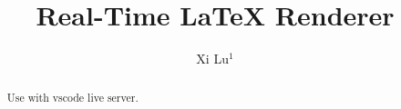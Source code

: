 \documentclass[aps,pra,reprint,twocolumn,nofootinbib]{revtex4-2}
\begin{document}
\title{
    Real-Time LaTeX Renderer
}

\author{
    Xi Lu$^{1}$
}


\begin{abstract}
    Use with vscode live server.
\end{abstract}

\maketitle




\end{document}
